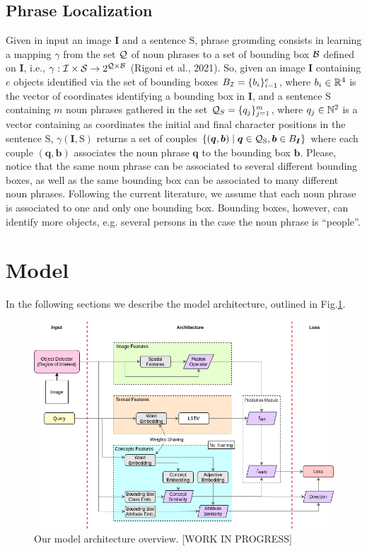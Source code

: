 \documentclass{article}
\begin{document}
\subsection{Phrase Localization}

Given in input an image $\bm{I}$ and a
sentence $\mathrm{S}$, phrase grounding consists in learning a mapping
$\gamma$ from the set $\mathcal{Q}$ of noun phrases to a set of bounding box
$\mathcal{B}$ defined on $\bm{I}$, i.e., $\gamma : \mathcal{I} \times \mathcal{S}
\rightarrow 2^{\mathcal{Q} \times \mathcal{B}}$ (Rigoni et al., 2021). So, given
an image $\bm{I}$ containing $e$ objects identified via the set of
bounding boxes $B_{\mathcal{I}} = \{ b_i \}^e_{i=1}$, where $b_i \in \mathbb{R}^4$
is the vector of coordinates identifying a bounding box in $\bm{I}$,
and a sentence $\mathrm{S}$ containing $m$ noun phrases gathered in
the set $\mathcal{Q}_S = \{ q_j \}^m_{j=1}$, where $q_j \in \mathbb{N}^2$ is a
vector containing as coordinates the initial and final character
positions in the sentence $\mathrm{S}$, $\gamma(\bm{I}, \mathrm{S})$
returns a set of couples $\{ (\bm{q}, \bm{b}) \mid \bm{q} \in
\mathcal{Q}_{\mathrm{S}}, \bm{b} \in B_{\bm{I}} \}$ where each couple
$(\bm{q}, \bm{b})$ associates the noun phrase $\bm{q}$ to the bounding
box $\bm{b}$. Please, notice that the same noun phrase can be
associated to several different bounding boxes, as well as the same
bounding box can be associated to many different noun phrases.
Following the current literature, we assume that each noun phrase is
associated to one and only one bounding box. Bounding boxes, however,
can identify more objects, e.g. several persons in the case the noun
phrase is ``people''.

\section{Model}

In the following sections we describe the model architecture, outlined
in Fig.\ref{fig:model-architecture}.

\begin{figure}
    \centering
    \includegraphics[width=1.0\textwidth]{figures/model-architecture.png}
    \caption[TODO]{Our model architecture overview. [WORK IN PROGRESS]}
    \label{fig:model-architecture}
  \end{figure}
\end{document}

